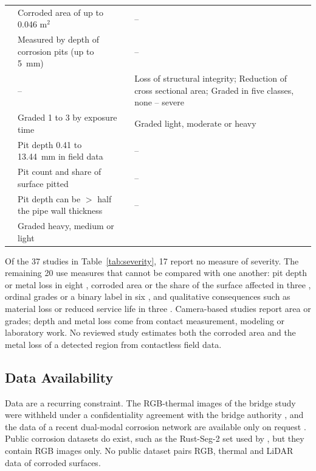 {\begin{xltabular}{\textwidth}{p{1.0cm}>{\RaggedRight\arraybackslash}Xp{1.0cm}>{\RaggedRight\arraybackslash}X}
\citep{Savino2025} & Corroded area of up to 0.046 m$^2$ & \citep{Liang2021} & -- \\
\citep{Egodawela2025} & Measured by depth of corrosion pits (up to 5~mm) & \citep{Espinoza2026} & -- \\
\citep{Maharjan2025} & -- & \citep{Arias2025} & Loss of structural integrity; Reduction of cross sectional area; Graded in five classes, none -- severe \\
\citep{Hernndez-Surez2026} & Graded 1 to 3 by exposure time & \citep{Fu2024} & Graded light, moderate or heavy \\
\citep{Akhlaghi2023} & Pit depth 0.41 to 13.44~mm in field data & \citep{Alvani2026} & -- \\
\citep{Suzuki2026} & Pit count and share of surface pitted & \citep{Imran2025} & -- \\
\citep{Huang2026a} & Pit depth can be $>$ half the pipe wall thickness & \citep{Yao2019} & -- \\
\citep{Rahman2021} & Graded heavy, medium or light &  &  \\
\end{xltabular}
}


Of the 37 studies in Table~\ref{tab:severity}, 17 report no measure of severity.
The remaining 20 use measures that cannot be compared with one another: pit depth
or metal loss in eight \citep{Liu2026,Wang2021,Qin2026,Egodawela2025,Akhlaghi2023,Huang2026a,Khodabux2021a,Yang2025}, corroded area or
the share of the surface affected in three \citep{Savino2025,Suzuki2026,Hu2023}, ordinal grades
or a binary label in six \citep{Bui2026,Hernndez-Surez2026,Rahman2021,Arias2025,Fu2024,Malashin2024}, and qualitative
consequences such as material loss or reduced service life in three
\citep{Elizalde2023,Wojciechowski2025,Yang2026a}. Camera-based studies report area or grades; depth and metal loss
come from contact measurement, modeling or laboratory work. No reviewed study
estimates both the corroded area and the metal loss of a detected region from
contactless field data.

\subsection{Data Availability}

Data are a recurring constraint. The RGB-thermal images of the bridge study were
withheld under a confidentiality agreement with the bridge authority \citep{Lim2021}, and
the data of a recent dual-modal corrosion network are available only on request
\citep{Mao2026}. Public corrosion datasets do exist, such as the Rust-Seg-2 set used by
\citep{Espinoza2026}, but they contain RGB images only. No public dataset pairs RGB, thermal
and LiDAR data of corroded surfaces.

